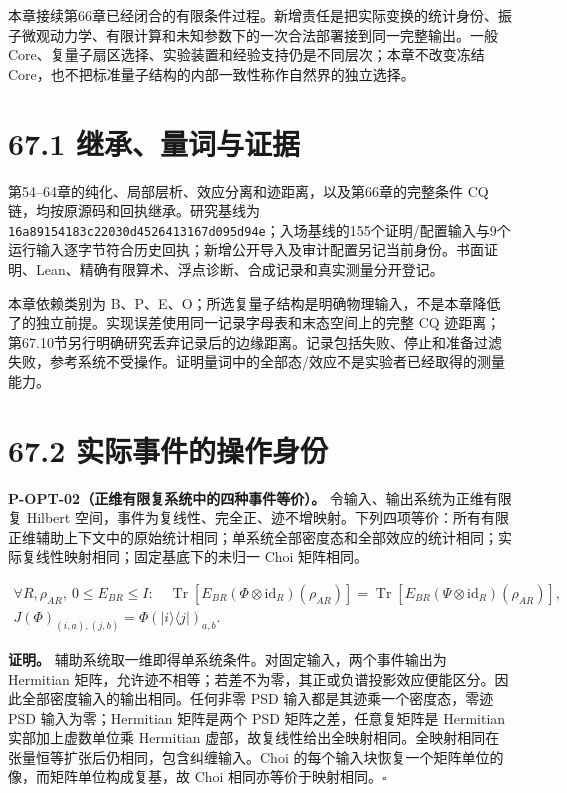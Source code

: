 \documentclass[
  11pt,
  oneside]{book}
\begin{document}
本章接续第66章已经闭合的有限条件过程。新增责任是把实际变换的统计身份、振子微观动力学、有限计算和未知参数下的一次合法部署接到同一完整输出。一般
Core、复量子扇区选择、实验装置和经验支持仍是不同层次；本章不改变冻结
Core，也不把标准量子结构的内部一致性称作自然界的独立选择。

\section{67.1 继承、量词与证据}

第54--64章的纯化、局部层析、效应分离和迹距离，以及第66章的完整条件 CQ
链，均按原源码和回执继承。研究基线为
\texttt{16a89154183c\allowbreak 22030d452641\allowbreak 3167d095d94e}；入场基线的155个证明/配置输入与9个运行输入逐字节符合历史回执；新增公开导入及审计配置另记当前身份。书面证明、Lean、精确有限算术、浮点诊断、合成记录和真实测量分开登记。

本章依赖类别为
B、P、E、O；所选复量子结构是明确物理输入，不是本章降低了的独立前提。实现误差使用同一记录字母表和末态空间上的完整
CQ
迹距离；第67.10节另行明确研究丢弃记录后的边缘距离。记录包括失败、停止和准备过滤失败，参考系统不受操作。证明量词中的全部态/效应不是实验者已经取得的测量能力。

\section{67.2 实际事件的操作身份}

\protect\hypertarget{p-opt-02}{}{}

\textbf{P-OPT-02（正维有限复系统中的四种事件等价）。}
令输入、输出系统为正维有限复 Hilbert
空间，事件为复线性、完全正、迹不增映射。下列四项等价：所有有限正维辅助上下文中的原始统计相同；单系统全部密度态和全部效应的统计相同；实际复线性映射相同；固定基底下的未归一
Choi 矩阵相同。

\[
\begin{gathered}
\forall R,\rho_{AR},\ 0\le E_{BR}\le I:\quad
\operatorname{Tr}\!\left[E_{BR}(\Phi\otimes\mathrm{id}_R)(\rho_{AR})\right]
=\operatorname{Tr}\!\left[E_{BR}(\Psi\otimes\mathrm{id}_R)(\rho_{AR})\right],\\
J(\Phi)_{(i,a),(j,b)}=\Phi(|i\rangle\langle j|)_{a,b}.
\end{gathered}
\]

\textbf{证明。} 辅助系统取一维即得单系统条件。对固定输入，两个事件输出为
Hermitian
矩阵，允许迹不相等；若差不为零，其正或负谱投影效应便能区分。因此全部密度输入的输出相同。任何非零
PSD 输入都是其迹乘一个密度态，零迹 PSD 输入为零；Hermitian 矩阵是两个
PSD 矩阵之差，任意复矩阵是 Hermitian 实部加上虚数单位乘 Hermitian
虚部，故复线性给出全映射相同。全映射相同在张量恒等扩张后仍相同，包含纠缠输入。Choi
的每个输入块恢复一个矩阵单位的像，而矩阵单位构成复基，故 Choi
相同亦等价于映射相同。\(\square\)
\end{document}
